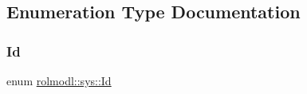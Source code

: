 \subsection{Enumeration Type Documentation}
\mbox{\label{namespacerolmodl_1_1sys_ae00db9e1ee9231659b4d1bce9b1de5ae}} 
\subsubsection{\texorpdfstring{Id}{Id}}
{\footnotesize\ttfamily enum \mbox{\hyperlink{namespacerolmodl_1_1sys_ae00db9e1ee9231659b4d1bce9b1de5ae}{rolmodl\+::sys\+::\+Id}}\hspace{0.3cm}{\ttfamily [strong]}}

